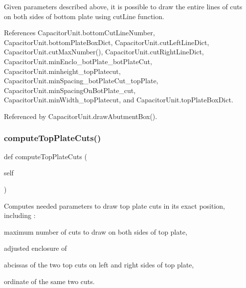 Given parameters described above, it is possible to draw the entire lines of cuts on both sides of bottom plate using {\ttfamily cut\+Line} function. 

References Capacitor\+Unit.\+bottom\+Cut\+Line\+Number, Capacitor\+Unit.\+bottom\+Plate\+Box\+Dict, Capacitor\+Unit.\+cut\+Left\+Line\+Dict, Capacitor\+Unit.\+cut\+Max\+Number(), Capacitor\+Unit.\+cut\+Right\+Line\+Dict, Capacitor\+Unit.\+min\+Enclo\+\_\+bot\+Plate\+\_\+bot\+Plate\+Cut, Capacitor\+Unit.\+minheight\+\_\+top\+Platecut, Capacitor\+Unit.\+min\+Spacing\+\_\+bot\+Plate\+Cut\+\_\+top\+Plate, Capacitor\+Unit.\+min\+Spacing\+On\+Bot\+Plate\+\_\+cut, Capacitor\+Unit.\+min\+Width\+\_\+top\+Platecut, and Capacitor\+Unit.\+top\+Plate\+Box\+Dict.



Referenced by Capacitor\+Unit.\+draw\+Abutment\+Box().

\mbox{\label{classpython_1_1capacitorunit_1_1CapacitorUnit_acf415dad7b8278ca474a08abd8386665}} 
\subsubsection{\texorpdfstring{compute\+Top\+Plate\+Cuts()}{computeTopPlateCuts()}}
{\footnotesize\ttfamily def compute\+Top\+Plate\+Cuts (\begin{DoxyParamCaption}\item[{}]{self }\end{DoxyParamCaption})}



Computes needed parameters to draw top plate cuts in its exact position, including \+: 


\begin{DoxyItemize}
\item maximum number of cuts to draw on both sides of top plate,
\item adjusted enclosure of
\item abcissas of the two top cuts on left and right sides of top plate,
\item ordinate of the same two cuts.
\end{DoxyItemize}

